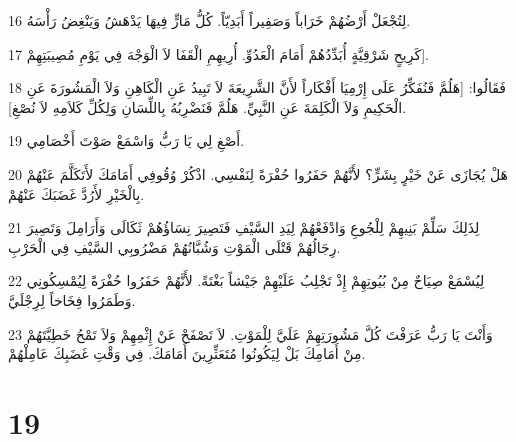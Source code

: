 \par 16 لِتُجْعَلْ أَرْضُهُمْ خَرَاباً وَصَفِيراً أَبَدِيّاً. كُلُّ مَارٍّ فِيهَا يَدْهَشُ وَيَنْغِضُ رَأْسَهُ.
\par 17 كَرِيحٍ شَرْقِيَّةٍ أُبَدِّدُهُمْ أَمَامَ الْعَدُوِّ. أُرِيهِمِ الْقَفَا لاَ الْوَجْهَ فِي يَوْمِ مُصِيبَتِهِمْ].
\par 18 فَقَالُوا: [هَلُمَّ فَنُفَكِّرُ عَلَى إِرْمِيَا أَفْكَاراً لأَنَّ الشَّرِيعَةَ لاَ تَبِيدُ عَنِ الْكَاهِنِ وَلاَ الْمَشُورَةَ عَنِ الْحَكِيمِ وَلاَ الْكَلِمَةَ عَنِ النَّبِيِّ. هَلُمَّ فَنَضْرِبُهُ بِاللِّسَانِ وَلِكُلِّ كَلاَمِهِ لاَ نُصْغِ].
\par 19 أَصْغِ لِي يَا رَبُّ وَاسْمَعْ صَوْتَ أَخْصَامِي.
\par 20 هَلْ يُجَازَى عَنْ خَيْرٍ بِشَرٍّ؟ لأَنَّهُمْ حَفَرُوا حُفْرَةً لِنَفْسِي. اذْكُرْ وُقُوفِي أَمَامَكَ لأَتَكَلَّمَ عَنْهُمْ بِالْخَيْرِ لأَرُدَّ غَضَبَكَ عَنْهُمْ.
\par 21 لِذَلِكَ سَلِّمْ بَنِيهِمْ لِلْجُوعِ وَادْفَعْهُمْ لِيَدِ السَّيْفِ فَتَصِيرَ نِسَاؤُهُمْ ثَكَالَى وَأَرَامِلَ وَتَصِيرَ رِجَالُهُمْ قَتْلَى الْمَوْتِ وَشُبَّانُهُمْ مَضْرُوبِي السَّيْفِ فِي الْحَرْبِ.
\par 22 لِيُسْمَعْ صِيَاحٌ مِنْ بُيُوتِهِمْ إِذْ تَجْلِبُ عَلَيْهِمْ جَيْشاً بَغْتَةً. لأَنَّهُمْ حَفَرُوا حُفْرَةً لِيُمْسِكُونِي وَطَمَرُوا فِخَاخاً لِرِجْلَيَّ.
\par 23 وَأَنْتَ يَا رَبُّ عَرَفْتَ كُلَّ مَشُورَتِهِمْ عَلَيَّ لِلْمَوْتِ. لاَ تَصْفَحْ عَنْ إِثْمِهِمْ وَلاَ تَمْحُ خَطِيَّتَهُمْ مِنْ أَمَامِكَ بَلْ لِيَكُونُوا مُتَعَثِّرِينَ أَمَامَكَ. فِي وَقْتِ غَضَبِكَ عَامِلْهُمْ.

\chapter{19}

